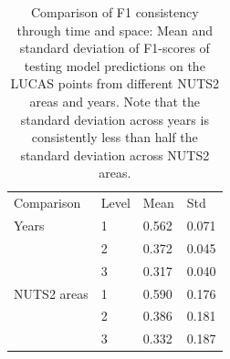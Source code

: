         \begin{table}[]
        \begin{tabular}{llll}
        Comparison & Level & Mean & Std \\
        Years & 1 & 0.562 & 0.071 \\
         & 2 & 0.372 & 0.045 \\
         & 3 & 0.317 & 0.040 \\
        NUTS2 areas & 1 & 0.590 & 0.176 \\
         & 2 & 0.386 & 0.181 \\
         & 3 & 0.332 & 0.187
        \end{tabular}
        \caption{Comparison of F1 consistency through time and space: Mean and standard deviation of F1-scores of testing model predictions on the LUCAS points from different NUTS2 areas and years. Note that the standard deviation across years is consistently less than half the standard deviation across NUTS2 areas.}
        \label{tab:f1_space_time}
        \end{table}
        
